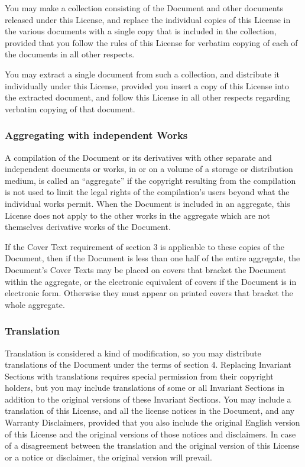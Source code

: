 You may make a collection consisting of the Document and other documents
released under this License, and replace the individual copies of this License
in the various documents with a single copy that is included in the collection,
provided that you follow the rules of this License for verbatim copying of each
of the documents in all other respects.

You may extract a single document from such a collection, and distribute it
individually under this License, provided you insert a copy of this License
into the extracted document, and follow this License in all other respects
regarding verbatim copying of that document.


\subsubsection{Aggregating with independent Works}

A compilation of the Document or its derivatives with other separate and
independent documents or works, in or on a volume of a storage or distribution
medium, is called an ``aggregate'' if the copyright resulting from the
compilation is not used to limit the legal rights of the compilation's users
beyond what the individual works permit. When the Document is included in an
aggregate, this License does not apply to the other works in the aggregate
which are not themselves derivative works of the Document.

If the Cover Text requirement of section 3 is applicable to these copies of the
Document, then if the Document is less than one half of the entire aggregate,
the Document's Cover Texts may be placed on covers that bracket the Document
within the aggregate, or the electronic equivalent of covers if the Document is
in electronic form. Otherwise they must appear on printed covers that bracket
the whole aggregate.


\subsubsection{Translation}

Translation is considered a kind of modification, so you may distribute
translations of the Document under the terms of section 4. Replacing Invariant
Sections with translations requires special permission from their copyright
holders, but you may include translations of some or all Invariant Sections in
addition to the original versions of these Invariant Sections.  You may include
a translation of this License, and all the license notices in the Document, and
any Warranty Disclaimers, provided that you also include the original English
version of this License and the original versions of those notices and
disclaimers.  In case of a disagreement between the translation and the
original version of this License or a notice or disclaimer, the original
version will prevail.

